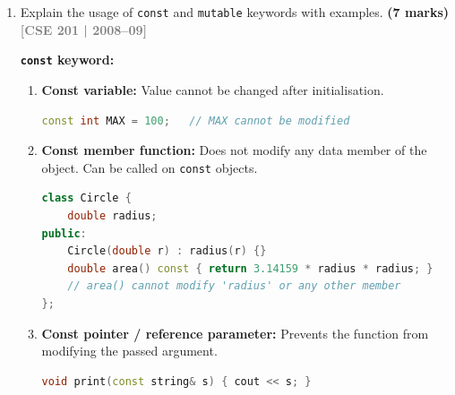 \documentclass[12pt,a3paper]{article}
\newcommand{\yr}[1]{\hfill\textcolor{gray}{\small\textbf{[#1]}}}
\newcommand{\mk}[1]{\textcolor{orange!70!black}{\small\textbf{(#1 marks)}}}
\begin{document}
\begin{enumerate}
\begin{tcolorbox}[enhanced,breakable,ansbox,colback=cB!4,colframe=cB,
  boxrule=0.8pt,arc=5pt,
  title={\textbf{Answer}},fonttitle=\bfseries\color{white},colbacktitle=cB]
\begin{lstlisting}[language=C++]
    static int getObjectCount() { return count; }
};
int SelfCounter::count = 0;

int main() {
    cout << SelfCounter::getObjectCount() << endl; // 0

    SelfCounter a, b;
    cout << SelfCounter::getObjectCount() << endl; // 2

    {
        SelfCounter c, d, e;
        cout << SelfCounter::getObjectCount() << endl; // 5
    }  // c, d, e destroyed here

    cout << SelfCounter::getObjectCount() << endl; // 2
    return 0;
}
\end{lstlisting}

\textbf{Note:} The copy constructor also increments \texttt{count}
because copy-constructing an object creates a new live instance.
The destructor decrements the count when any object (original or
copy) is destroyed.

\end{tcolorbox}

\item Explain the usage of \texttt{const} and \texttt{mutable} keywords with examples. \mk{7}
\yr{CSE 201 | 2008--09}

\begin{tcolorbox}[enhanced,breakable,ansbox,colback=cB!4,colframe=cB,
  boxrule=0.8pt,arc=5pt,
  title={\textbf{Answer}},fonttitle=\bfseries\color{white},colbacktitle=cB]

\textbf{\texttt{const} keyword:}

\begin{enumerate}[label=\textbf{\arabic*.}]
  \item \textbf{Const variable:} Value cannot be changed after
    initialisation.
\begin{lstlisting}[language=C++]
const int MAX = 100;   // MAX cannot be modified
\end{lstlisting}
  \item \textbf{Const member function:} Does not modify any data
    member of the object.  Can be called on \texttt{const} objects.
\begin{lstlisting}[language=C++]
class Circle {
    double radius;
public:
    Circle(double r) : radius(r) {}
    double area() const { return 3.14159 * radius * radius; }
    // area() cannot modify 'radius' or any other member
};
\end{lstlisting}
  \item \textbf{Const pointer / reference parameter:} Prevents the
    function from modifying the passed argument.
\begin{lstlisting}[language=C++]
void print(const string& s) { cout << s; }
\end{lstlisting}
\end{enumerate}


\end{tcolorbox}
\end{enumerate}
\end{document}
